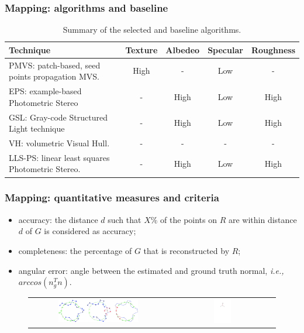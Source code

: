 \documentclass{beamer}
\begin{document}
\begin{frame}
\frametitle{Mapping: algorithms and baseline}

\begin{table}[!htbp]
\centering
\begin{tabular}{p{4cm}|c|c|c|c}
\toprule
Technique & Texture & Albedeo & Specular & Roughness\\
\midrule
PMVS: patch-based, seed points propagation MVS. & High & - & Low & -\\
\midrule
EPS: example-based Photometric Stereo & - & High & Low & High \\
\midrule
GSL: Gray-code Structured Light technique & - & High & Low & High\\
\midrule\midrule
VH: volumetric Visual Hull. & - & - & - & -\\
\midrule
LLS-PS: linear least squares Photometric Stereo. & - & High & Low & High\\
\bottomrule
\end{tabular}
\caption{Summary of the selected and baseline algorithms.}
\end{table}

\end{frame}

\begin{frame}
\frametitle{Mapping: quantitative measures and criteria}

\begin{itemize}
\item accuracy: the distance $d$ such that $X\%$ of the points on $R$ are within distance $d$ of $G$ is considered as accuracy;
\item completeness: the percentage of $G$ that is reconstructed by $R$;
\item angular error: angle between the estimated and ground truth normal, \textit{i.e.,} $arccos(n_g^T n)$.
\end{itemize}

\begin{figure}[!htbp]
\begin{tabular}{cc}
\includegraphics[width=0.6\textwidth]{mapping/qm_acc_cmp} &
\includegraphics[width=0.17\textwidth]{mapping/qm_ang_error}
\end{tabular}
\end{figure}

\end{frame}
\end{document}
